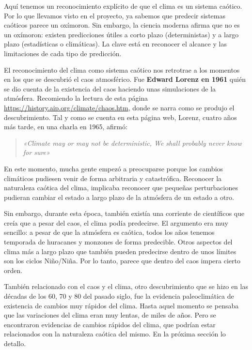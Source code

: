 \documentclass[
  10pt,
  a4paper,
  DIV=11,
  numbers=noendperiod,
  open=any]{scrreprt}
\numberwithin{equation}{chapter}
\numberwithin{equation}{section}
\renewcommand{\[}{\begin{equation}}
\renewcommand{\]}{\end{equation}}
\begin{document}
Aquí tenemos un reconocimiento explícito de que el clima es un sistema
caótico. Por lo que llevamos visto en el proyecto, ya sabemos que
predecir sistemas caóticos parece un oxímoron. Sin embargo, la ciencia
moderna afirma que no es un oxímoron: existen predicciones útiles a
corto plazo (deterministas) y a largo plazo (estadísticas o climáticas).
La clave está en reconocer el alcance y las limitaciones de cada tipo de
predicción.

El reconocimiento del clima como sistema caótico nos retrotrae a los
momentos en los que se descubrió el caos atmosférico. Fue \textbf{Edward
Lorenz en 1961} quién se dio cuenta de la existencia del caos haciendo
unas simulaciones de la atmósfera. Recomiendo la lectura de esta página
\url{https://history.aip.org/climate/chaos.htm}, donde se narra
como se produjo el descubrimiento. Tal y como se cuenta en esta página web,
Lorenz, cuatro años más tarde, en una charla en 1965, afirmó:

\begin{quote}
\itshape
«Climate may or may not be deterministic, We shall probably never
know for sure»
\end{quote}

En este momento, mucha gente empezó a preocuparse porque los cambios
climáticos pudiesen venir de forma arbitraria y catastrófica. Reconocer
la naturaleza caótica del clima, implicaba reconocer que pequeñas
perturbaciones pudieran cambiar el estado a largo plazo de la atmósfera
de un estado a otro.

Sin embargo, durante esta época, también existía una corriente de
científicos que creía que a pesar del caos, el clima podía predecirse.
El argumento era muy sencillo: a pesar de que la atmósfera es caótica,
todos los años tenemos temporada de huracanes y monzones de forma
predecible. Otros aspectos del clima más a largo plazo que también
pueden predecirse dentro de unos límites son los ciclos Niño/Niña. Por
lo tanto, parece que dentro del caos impera cierto orden.

También relacionado con el caos y el clima, otro descubrimiento que se
hizo en las décadas de los 60, 70 y 80 del pasado siglo, fue la
evidencia paleoclimática de existencia de cambios muy rápidos del clima.
Hasta aquel momento se pensaba que las variaciones del clima eran muy
lentas, de miles de años. Pero se encontraron evidencias de cambios
rápidos del clima, que podrían estar relacionados con la naturaleza
caótica del mismo. En la próxima sección lo detallo.
\end{document}
